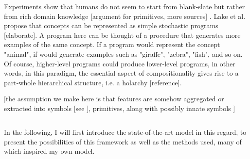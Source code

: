 Experiments show that humans do not seem to start from blank-slate but rather from rich domain knowledge [argument for primitives, more sources] \cite{lake_building_2016}. Lake et al. propose that concepts can be represented as simple stochastic programs [elaborate]. A program here can be thought of a procedure that generates more examples of the same concept. If a program would represent the concept "animal", if would generate examples such as "giraffe", "zebra", "fish", and so on. Of course, higher-level programs could produce lower-level programs, in other words, in this paradigm, the essential aspect of compositionality gives rise to a part-whole hierarchical structure, i.e. a holarchy [reference].





[the assumption we make here is that features are somehow aggregated or extracted into symbols [see \cite{garcez_neurosymbolic_2020}], primitives, along with possibly innate symbols \cite{Lake_Ullman_Tenenbaum_Gershman_2017}] 



\subsection{}

In the following, I will first introduce the state-of-the-art model in this regard, to present the possibilities of this framework as well as the methods used, many of which inspired my own model.

